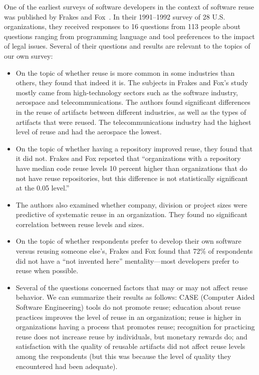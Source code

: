 \documentclass{casicswhitepaper}
\begin{document}
One of the earliest surveys of software developers in the context of software reuse was published by Frakes and Fox~\cite{frakes1995sixteen}.  In their 1991--1992 survey of 28 U.S. organizations, they received responses to 16 questions from 113 people about questions ranging from programming language and tool preferences to the impact of legal issues.  Several of their questions and results are relevant to the topics of our own survey:
\begin{itemize}

\item On the topic of whether reuse is more common in some industries than others, they found that indeed it is.  The subjects in Frakes and Fox's study~\cite{frakes1995sixteen} mostly came from high-technology sectors such as the software industry, aerospace and telecommunications.  The authors found significant differences in the reuse of artifacts between different industries, as well as the types of artifacts that were reused.  The telecommunications industry had the highest level of reuse and had the aerospace the lowest.

\item On the topic of whether having a repository improved reuse, they found that it did not.  Frakes and Fox reported that ``organizations with a repository have median code reuse levels 10 percent higher than organizations that do not have reuse repositories, but this difference is not statistically significant at the 0.05 level.''

\item The authors also examined whether company, division or project sizes were predictive of systematic reuse in an organization.  They found no significant correlation between reuse levels and sizes.

\item On the topic of whether respondents prefer to develop their own software versus reusing someone else's, Frakes and Fox found that 72\% of respondents did not have a ``not invented here'' mentality---most developers prefer to reuse when possible.

\item Several of the questions concerned factors that may or may not affect reuse behavior.  We can summarize their results as follows: CASE (Computer Aided Software Engineering) tools do not promote reuse; education about reuse practices improves the level of reuse in an organization; reuse is higher in organizations having a process that promotes reuse;  recognition for practicing reuse does not increase reuse by individuals, but monetary rewards do; and satisfaction with the quality of reusable artifacts did not affect reuse levels among the respondents (but this was because the level of quality they encountered had been adequate).

\end{itemize}
\end{document}
